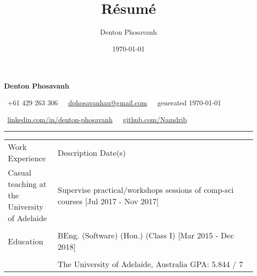 \documentclass[a4paper]{article}
\title{R\'{e}sum\'{e}}
\author{Denton Phosavanh}
\date{\today}
\begin{document}
	\centering %
	{\LARGE \textbf{Denton Phosavanh}}

	\faMobilePhone\ +61 429 263 306\ \ \faInbox\ \href{mailto:dphosavanhau@gmail.com}{dphosavanhau@gmail.com}\ \ \faCalendar\ generated \today

	\faLinkedinSign\ \href{https://www.linkedin.com/in/denton-phosavanh}{linkedin.com/in/denton-phosavanh}\ \ \faGithub\ \href{https://www.github.com/Namdrib}{github.com/Namdrib}
	\hrule
	\vspace{10pt}


	\centering
	\begin{tabu} to 
		\rowfont{\bfseries\large} Work Experience & Description \hfill Date(s) \\
		Casual teaching at the University of Adelaide & Supervise practical/workshops sessions of comp-sci courses \hfill [Jul 2017 - Nov 2017] \\

		& \\
		\rowfont{\bfseries\large} Education & BEng. (Software) (Hon.) (Class I) \hfill [Mar 2015 - Dec 2018] \\

		& \\
		& The University of Adelaide, Australia \hfill GPA: 5.844 / 7 \\


\end{tabu}
\end{document}
